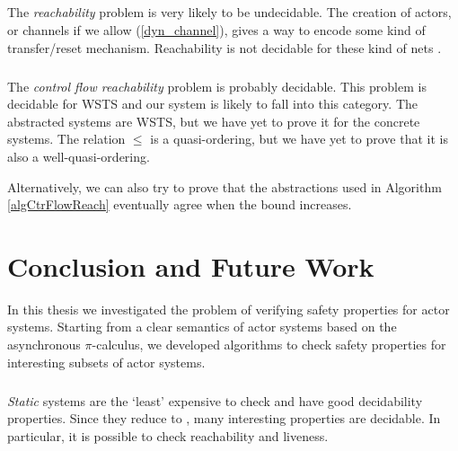 \documentclass[a4paper]{report}
\numberwithin{algorithm}{chapter}
\begin{document}
\paragraph{}
The \emph{reachability} problem is very likely to be undecidable.
The creation of actors, or channels if we allow (\ref{dyn_channel}), gives a way to encode some kind of transfer/reset mechanism.
Reachability is not decidable for these kind of nets \cite{DBLP:journals/tcs/ArakiK76,DBLP:conf/icalp/DufourdFS98}.

\paragraph{}
The \emph{control flow reachability} problem is probably decidable.
This problem is decidable for WSTS \cite{DBLP:conf/lics/AbdullaCJT96,DBLP:journals/tcs/FinkelS01} and our system is likely to fall into this category.
The abstracted systems are WSTS, but we have yet to prove it for the concrete systems.
The relation $\leq$ is a quasi-ordering, but we have yet to prove that it is also a well-quasi-ordering.

Alternatively, we can also try to prove that the abstractions used in Algorithm \ref{algCtrFlowReach} eventually agree when the bound increases.


\chapter{Conclusion and Future Work}

In this thesis we investigated the problem of verifying safety properties for actor systems.
Starting from a clear semantics of actor systems based on the asynchronous $\pi$-calculus, we developed algorithms to check safety properties for interesting subsets of actor systems.

\paragraph{}
\emph{Static} systems are the `least' expensive to check and have good decidability properties.
Since they reduce to \pns{}, many interesting properties are decidable.
In particular, it is possible to check reachability and liveness. %
\end{document}
